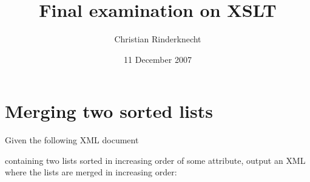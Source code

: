 \documentclass[11pt,a4paper]{article}
\title{Final examination on XSLT}
\author{Christian Rinderknecht}
\date{11 December 2007}
\newcommand\XML{\textsf{XML}\xspace}
\begin{document}
\maketitle

\thispagestyle{empty}

\section{Merging two sorted lists}

Given the following \XML document


\noindent containing two lists sorted in increasing order of some
attribute, output an \XML where the lists are merged in increasing
order:

\end{document}

